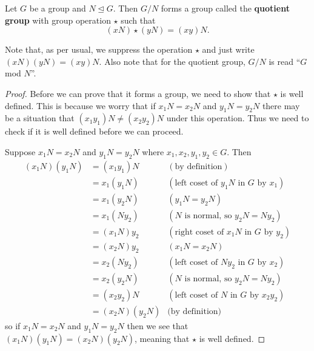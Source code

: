 \begin{theorem}\label{thrm-quotient-group-requirement}
    Let $G$ be a group and $N \unlhd G$. Then $G / N$ forms a group called the \textbf{quotient group} with group operation $\star$ such that
    \[
        (xN) \star (yN) = (xy)N.
    \]
\end{theorem}
Note that, as per usual, we suppress the operation $\star$ and just write $(xN)(yN) = (xy)N$. Also note that for the quotient group, $G / N$ is read ``$G$ mod $N$''.
\begin{proof}
    Before we can prove that it forms a group, we need to show that $\star$ is well defined. This is because we worry that if $x_1N = x_2N$ and $y_1N = y_2N$ there may be a situation that $(x_1y_1)N \neq (x_2y_2)N$ under this operation. Thus we need to check if it is well defined before we can proceed.

    Suppose $x_1N = x_2N$ and $y_1N = y_2N$ where $x_1, x_2, y_1, y_2 \in G$. Then
    \begin{align*}
        (x_1N)(y_1N) &= (x_1y_1)N & (\text{by definition})\\
        &= x_1(y_1N) & (\text{left coset of } y_1N \text{ in } G \text{ by } x_1)\\
        &= x_1(y_2N) & (y_1N = y_2N)\\
        &= x_1(Ny_2) & (N \text{ is normal, so } y_2N=Ny_2)\\
        &= (x_1N)y_2 & (\text{right coset of } x_1N \text{ in } G \text{ by } y_2)\\
        &= (x_2N)y_2 & (x_1N = x_2N)\\
        &= x_2(Ny_2) & (\text{left coset of } Ny_2 \text{ in } G \text{ by } x_2)\\
        &= x_2(y_2N) & (N \text{ is normal, so } y_2N=Ny_2)\\
        &= (x_2y_2)N & (\text{left coset of } N \text{ in } G \text{ by } x_2y_2)\\
        &= (x_2N)(y_2N) & \text{(by definition)}
    \end{align*}
    so if $x_1N = x_2N$ and $y_1N = y_2N$ then we see that $(x_1N)(y_1N) = (x_2N)(y_2N)$, meaning that $\star$ is well defined.


\end{proof}
